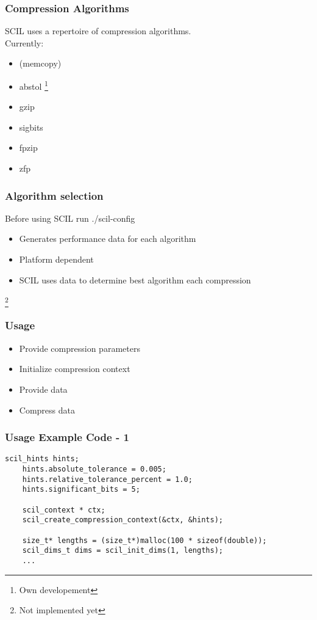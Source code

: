 \documentclass[compress]{beamer}
\begin{document}
\begin{frame}
	\frametitle{Compression Algorithms}

	SCIL uses a repertoire of compression algorithms.\\
	Currently:

	\bigskip

	\begin{itemize}
		\item (memcopy)
		\item abstol \footnote{Own developement}
		\item gzip
		\item sigbits \footnotemark[\value{footnote}]
		\item fpzip
		\item zfp
	\end{itemize}

	\setcounter{footnote}{0}
\end{frame}

\begin{frame}
	\frametitle{Algorithm selection}

	Before using SCIL run ./scil-config

	\bigskip

	\begin{itemize}
		\item Generates performance data for each algorithm
		\item Platform dependent
		\item SCIL uses data to determine best algorithm each compression
	\end{itemize}

	\footnote{Not implemented yet}
\end{frame}

\begin{frame}
	\frametitle{Usage}

	\begin{itemize}
		\item Provide compression parameters
		\item Initialize compression context
		\item Provide data
		\item Compress data
	\end{itemize}
\end{frame}

\begin{frame}[fragile]
	\frametitle{Usage Example Code - 1}

	\begin{lstlisting}[caption=SCIL usage example - 1]
	scil_hints hints;
	hints.absolute_tolerance = 0.005;
	hints.relative_tolerance_percent = 1.0;
	hints.significant_bits = 5;

	scil_context * ctx;
	scil_create_compression_context(&ctx, &hints);

	size_t* lengths = (size_t*)malloc(100 * sizeof(double));
	scil_dims_t dims = scil_init_dims(1, lengths);
	...
	\end{lstlisting}

\end{frame}
\end{document}
